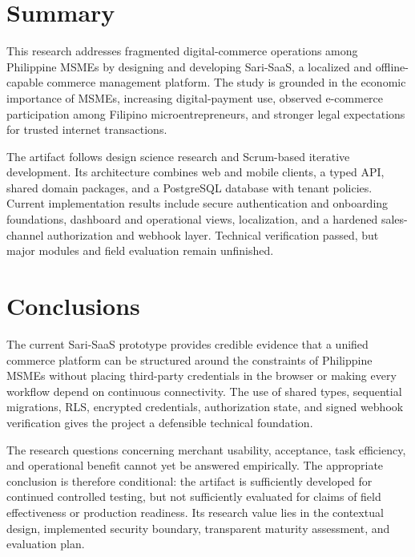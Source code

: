 \documentclass[12pt,oneside]{report}
\begin{document}
\section{Summary}
This research addresses fragmented digital-commerce operations among
Philippine MSMEs by designing and developing Sari-SaaS, a localized and
offline-capable commerce management platform. The study is grounded in the
economic importance of MSMEs, increasing digital-payment use, observed
e-commerce participation among Filipino microentrepreneurs, and stronger legal
expectations for trusted internet transactions.

The artifact follows design science research and Scrum-based iterative
development. Its architecture combines web and mobile clients, a typed API,
shared domain packages, and a PostgreSQL database with tenant policies. Current
implementation results include secure authentication and onboarding
foundations, dashboard and operational views, localization, and a hardened
sales-channel authorization and webhook layer. Technical verification passed,
but major modules and field evaluation remain unfinished.

\section{Conclusions}
The current Sari-SaaS prototype provides credible evidence that a unified
commerce platform can be structured around the constraints of Philippine MSMEs
without placing third-party credentials in the browser or making every workflow
depend on continuous connectivity. The use of shared types, sequential
migrations, RLS, encrypted credentials, authorization state, and signed webhook
verification gives the project a defensible technical foundation.

The research questions concerning merchant usability, acceptance, task
efficiency, and operational benefit cannot yet be answered empirically. The
appropriate conclusion is therefore conditional: the artifact is sufficiently
developed for continued controlled testing, but not sufficiently evaluated for
claims of field effectiveness or production readiness. Its research value lies
in the contextual design, implemented security boundary, transparent maturity
assessment, and evaluation plan.
\end{document}
